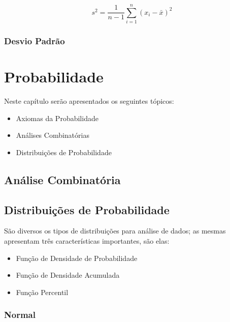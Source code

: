 \documentclass[
]{book}
\providecommand{\tightlist}{%
  \setlength{\itemsep}{0pt}\setlength{\parskip}{0pt}}
\begin{document}
\begin{equation}
s^2 =  \frac{1}{n-1}\sum_{i=1}^n(x_i - \bar{x})^2
\end{equation}

\hypertarget{desvio-padruxe3o}{%
\subsection{Desvio Padrão}\label{desvio-padruxe3o}}

\hypertarget{probabilidade}{%
\chapter{Probabilidade}\label{probabilidade}}

Neste capítulo serão apresentados os seguintes tópicos:

\begin{itemize}
\tightlist
\item
  Axiomas da Probabilidade
\item
  Análises Combinatórias
\item
  Distribuições de Probabilidade
\end{itemize}

\hypertarget{anuxe1lise-combinatuxf3ria}{%
\section{Análise Combinatória}\label{anuxe1lise-combinatuxf3ria}}

\hypertarget{distribuiuxe7uxf5es-de-probabilidade}{%
\section{Distribuições de Probabilidade}\label{distribuiuxe7uxf5es-de-probabilidade}}

São diversos os tipos de distribuições para análise de dados; as mesmas apresentam três características importantes, são elas:

\begin{itemize}
\tightlist
\item
  Função de Densidade de Probabilidade
\item
  Função de Densidade Acumulada
\item
  Função Percentil
\end{itemize}

\hypertarget{normal}{%
\subsection{Normal}\label{normal}}
\end{document}
